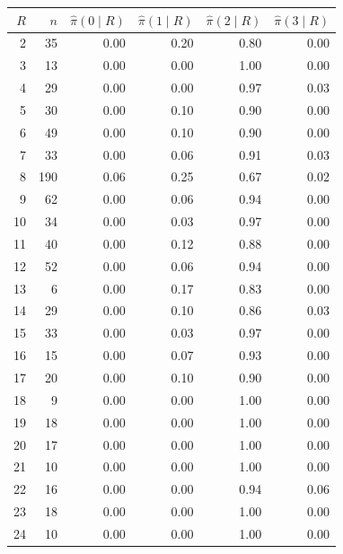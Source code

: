 \begin{tabular}{rrrrrr}
\toprule
$R$ & $n$ & $\hat\pi(0\mid R)$ & $\hat\pi(1\mid R)$ & $\hat\pi(2\mid R)$ & $\hat\pi(3\mid R)$ \\
\midrule
2 & 35 & 0.00 & 0.20 & 0.80 & 0.00 \\
3 & 13 & 0.00 & 0.00 & 1.00 & 0.00 \\
4 & 29 & 0.00 & 0.00 & 0.97 & 0.03 \\
5 & 30 & 0.00 & 0.10 & 0.90 & 0.00 \\
6 & 49 & 0.00 & 0.10 & 0.90 & 0.00 \\
7 & 33 & 0.00 & 0.06 & 0.91 & 0.03 \\
8 & 190 & 0.06 & 0.25 & 0.67 & 0.02 \\
9 & 62 & 0.00 & 0.06 & 0.94 & 0.00 \\
10 & 34 & 0.00 & 0.03 & 0.97 & 0.00 \\
11 & 40 & 0.00 & 0.12 & 0.88 & 0.00 \\
12 & 52 & 0.00 & 0.06 & 0.94 & 0.00 \\
13 & 6 & 0.00 & 0.17 & 0.83 & 0.00 \\
14 & 29 & 0.00 & 0.10 & 0.86 & 0.03 \\
15 & 33 & 0.00 & 0.03 & 0.97 & 0.00 \\
16 & 15 & 0.00 & 0.07 & 0.93 & 0.00 \\
17 & 20 & 0.00 & 0.10 & 0.90 & 0.00 \\
18 & 9 & 0.00 & 0.00 & 1.00 & 0.00 \\
19 & 18 & 0.00 & 0.00 & 1.00 & 0.00 \\
20 & 17 & 0.00 & 0.00 & 1.00 & 0.00 \\
21 & 10 & 0.00 & 0.00 & 1.00 & 0.00 \\
22 & 16 & 0.00 & 0.00 & 0.94 & 0.06 \\
23 & 18 & 0.00 & 0.00 & 1.00 & 0.00 \\
24 & 10 & 0.00 & 0.00 & 1.00 & 0.00 \\
\bottomrule
\end{tabular}
